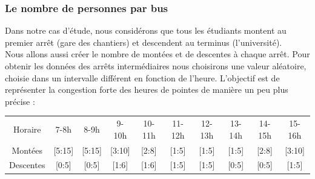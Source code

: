 \documentclass[a4paper,11pt]{article}
\begin{document}
		\subsubsection{Le nombre de personnes par bus}
			Dans notre cas d'étude, nous considérons que tous les étudiants montent au premier arrêt (gare des chantiers) et descendent au terminus (l'université).\\
			Nous allons aussi créer le nombre de montées et de descentes à chaque arrêt.
 			Pour obtenir les données des arrêts intermédiaires nous choisirons une valeur aléatoire, choisie dans un intervalle différent en fonction de l'heure. L'objectif est de représenter la congestion forte des heures de pointes de manière un peu plus précise : \\
 			\begin{tabular}{ | c | c | c | c | c | c | c | c | c | c |}
 				\hline			
   				Horaire & 7-8h & 8-9h & 9-10h & 10-11h & 11-12h & 12-13h & 13-14h & 14-15h & 15-16h\\
   				Montées & [5:15] & [5:15] & [3:10] & [2:8] & [1:5] & [1:5] & [1:5] & [2:8] & [3:10]\\
   				Descentes & [0:5] & [0:5] & [1:6] & [1:6] & [1:5] & [1:5] & [0:5] & [0:5] & [1:5]\\
 				\hline  
 			\end{tabular}\\
\end{document}
